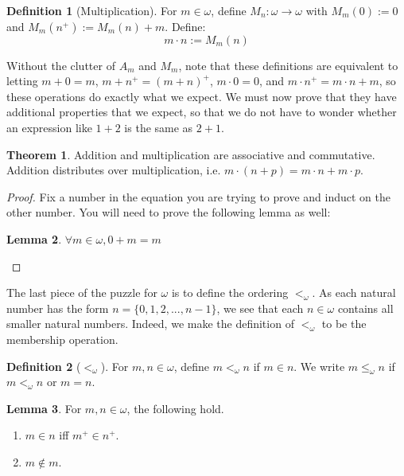 \documentclass[11pt, oneside]{article}   	%
\theoremstyle{definition}
\newtheorem{definition}{Definition}[section]
\newtheorem{theorem}{Theorem}[section]
\newtheorem{lemma}[theorem]{Lemma}
\begin{document}
\begin{definition}[Multiplication]
	For $m\in\omega$, define $M_n : \omega\rightarrow\omega$ with $M_m(0) := 0$ and $M_m(n^+) := M_m(n) + m$. 
	Define:
	\begin{equation}
		m\cdot n := M_m(n)
	\end{equation}
\end{definition}

Without the clutter of $A_m$ and $M_m$, note that these definitions are equivalent to letting $m + 0 = m$, $m + n^+ = (m + 
n)^+$, $m\cdot 0 = 0$, and $m\cdot n^+ = m\cdot n + m$, so these operations do exactly what we expect. We must now 
prove that they have additional properties that we expect, so that we do not have to wonder whether an expression like $1 + 2$ 
is the same as $2 + 1$. 

\begin{theorem}
	Addition and multiplication are associative and commutative. Addition distributes over multiplication, i.e. $m\cdot (n + p) 
	= m\cdot n + m\cdot p$. 
\end{theorem}

\begin{proof}
Fix a number in the equation you are trying to prove and induct on the other number. You will need 
to prove the following lemma as well:
\begin{lemma}
	$\forall m\in\omega, 0 + m = m$
\end{lemma}
\end{proof}

The last piece of the puzzle for $\omega$ is to define the ordering $<_\omega$. As each natural number has the form 
$n = \{0, 1, 2, ..., n - 1\}$, we see that each $n\in\omega$ contains all smaller natural numbers. Indeed, we make the 
definition of $<_\omega$ to be the membership operation.
\begin{definition}[$<_\omega$]
	For $m, n\in\omega$, define $m <_\omega n$ if $m\in n$. We write $m\leq_\omega n$ if $m <_\omega n$ or $m = n$. 
\end{definition}

\begin{lemma}
	For $m, n\in\omega$, the following hold.
	\begin{enumerate}
		\item $m\in n$ iff $m^+\in n^+$. 
		\item $m\not\in m$.
	\end{enumerate}
\end{lemma}
\end{document}
